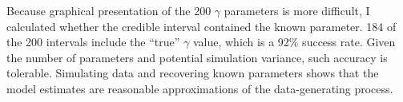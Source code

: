 \documentclass[12pt]{article}
\begin{document}
Because graphical presentation of the 200 $\gamma$ parameters is more difficult, I calculated whether the credible interval contained the known parameter. 
184 of the 200 intervals include the ``true'' $\gamma$ value, which is a 92\% success rate. 
Given the number of parameters and potential simulation variance, such accuracy is tolerable. 
Simulating data and recovering known parameters shows that the model estimates are reasonable approximations of the data-generating process. 
 



%
%
%
%
%
%
%
%








\singlespace


 
\end{document}
